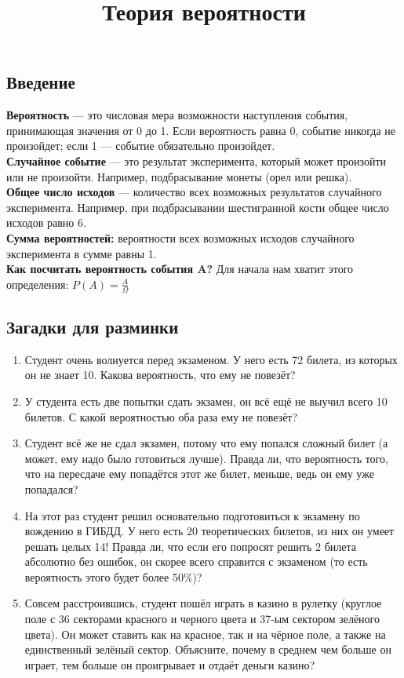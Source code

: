 \documentclass[a4paper,12pt]{article}
\title{Теория вероятности}
\date{}
\begin{document}
\maketitle
    \subsection*{Введение}
    \textbf{Вероятность} — это числовая мера возможности наступления события, принимающая значения от 0 до 1. Если вероятность равна 0, событие никогда не произойдет; если 1 — событие обязательно произойдет. \\
    \textbf{Случайное событие} — это результат эксперимента, который может произойти или не произойти. Например, подбрасывание монеты (орел или решка). \\
    \textbf{Общее число исходов} — количество всех возможных результатов случайного эксперимента. Например, при подбрасывании шестигранной кости общее число исходов равно 6. \\
    \textbf{Сумма вероятностей:} вероятности всех возможных исходов случайного эксперимента в сумме равны 1. \\
    \textbf{Как посчитать вероятность события A?} Для начала нам хватит этого определения: $P(A) = \frac{A}{\Omega}$
    \subsection*{Загадки для разминки}
    \begin{enumerate}
        \item Студент очень волнуется перед экзаменом. У него есть 72 билета, из которых он не знает 10. Какова вероятность, что ему не повезёт?
        \item У студента есть две попытки сдать экзамен, он всё ещё не выучил всего 10 билетов. С какой вероятностью оба раза ему не повезёт?
        \item Студент всё же не сдал экзамен, потому что ему попался сложный билет (а может, ему надо было готовиться лучше). Правда ли, что вероятность того, что на пересдаче ему попадётся этот же билет, меньше, ведь он ему уже попадался?
        \item На этот раз студент решил основательно подготовиться к экзамену по вождению в ГИБДД. У него есть 20 теоретических билетов, из них он умеет решать целых 14! Правда ли, что если его попросят решить 2 билета абсолютно без ошибок, он скорее всего справится с экзаменом (то есть вероятность этого будет более 50\%)?
        \item Совсем расстроившись, студент пошёл играть в казино в рулетку (круглое поле с 36 секторами красного и черного цвета и 37-ым сектором зелёного цвета). Он может ставить как на красное, так и на чёрное поле, а также на единственный зелёный сектор. Объясните, почему в среднем чем больше он играет, тем больше он проигрывает и отдаёт деньги казино?
    \end{enumerate}
\end{document}
